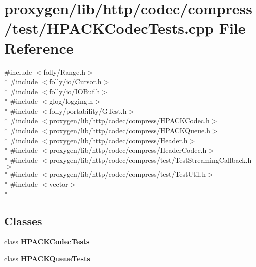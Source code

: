 \section{proxygen/lib/http/codec/compress/test/\+H\+P\+A\+C\+K\+Codec\+Tests.cpp File Reference}
\label{HPACKCodecTests_8cpp}
{\ttfamily \#include $<$folly/\+Range.\+h$>$}\\*
{\ttfamily \#include $<$folly/io/\+Cursor.\+h$>$}\\*
{\ttfamily \#include $<$folly/io/\+I\+O\+Buf.\+h$>$}\\*
{\ttfamily \#include $<$glog/logging.\+h$>$}\\*
{\ttfamily \#include $<$folly/portability/\+G\+Test.\+h$>$}\\*
{\ttfamily \#include $<$proxygen/lib/http/codec/compress/\+H\+P\+A\+C\+K\+Codec.\+h$>$}\\*
{\ttfamily \#include $<$proxygen/lib/http/codec/compress/\+H\+P\+A\+C\+K\+Queue.\+h$>$}\\*
{\ttfamily \#include $<$proxygen/lib/http/codec/compress/\+Header.\+h$>$}\\*
{\ttfamily \#include $<$proxygen/lib/http/codec/compress/\+Header\+Codec.\+h$>$}\\*
{\ttfamily \#include $<$proxygen/lib/http/codec/compress/test/\+Test\+Streaming\+Callback.\+h$>$}\\*
{\ttfamily \#include $<$proxygen/lib/http/codec/compress/test/\+Test\+Util.\+h$>$}\\*
{\ttfamily \#include $<$vector$>$}\\*
\subsection*{Classes}
\begin{DoxyCompactItemize}
\item 
class {\bf H\+P\+A\+C\+K\+Codec\+Tests}
\item 
class {\bf H\+P\+A\+C\+K\+Queue\+Tests}
\end{DoxyCompactItemize}
